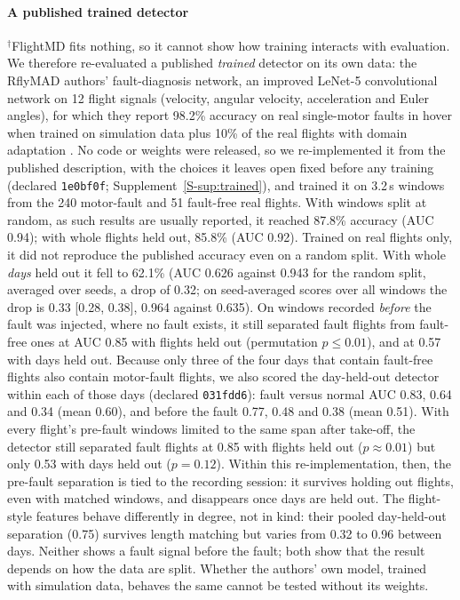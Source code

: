 \documentclass[preprint,12pt]{elsarticle}
\begin{document}
\paragraph{A published trained detector}
\label{sec:trained}
$^\dagger$FlightMD fits nothing, so it cannot show how training interacts with evaluation. We therefore re-evaluated a published \emph{trained} detector on its own data: the RflyMAD authors' fault-diagnosis network, an improved LeNet-5 convolutional network on 12 flight signals (velocity, angular velocity, acceleration and Euler angles), for which they report 98.2\% accuracy on real single-motor faults in hover when trained on simulation data plus 10\% of the real flights with domain adaptation \cite{le2025rflymad}. No code or weights were released, so we re-implemented it from the published description, with the choices it leaves open fixed before any training (declared \texttt{1e0bf0f}; Supplement~\ref{S-sup:trained}), and trained it on 3.2\,s windows from the 240 motor-fault and 51 fault-free real flights. With windows split at random, as such results are usually reported, it reached 87.8\% accuracy (AUC 0.94); with whole flights held out, 85.8\% (AUC 0.92). Trained on real flights only, it did not reproduce the published accuracy even on a random split. With whole \emph{days} held out it fell to 62.1\% (AUC 0.626 against 0.943 for the random split, averaged over seeds, a drop of 0.32; on seed-averaged scores over all windows the drop is 0.33 [0.28, 0.38], 0.964 against 0.635). On windows recorded \emph{before} the fault was injected, where no fault exists, it still separated fault flights from fault-free ones at AUC 0.85 with flights held out (permutation $p\le0.01$), and at 0.57 with days held out. Because only three of the four days that contain fault-free flights also contain motor-fault flights, we also scored the day-held-out detector within each of those days (declared \texttt{031fdd6}): fault versus normal AUC 0.83, 0.64 and 0.34 (mean 0.60), and before the fault 0.77, 0.48 and 0.38 (mean 0.51). With every flight's pre-fault windows limited to the same span after take-off, the detector still separated fault flights at 0.85 with flights held out ($p\approx0.01$) but only 0.53 with days held out ($p=0.12$). Within this re-implementation, then, the pre-fault separation is tied to the recording session: it survives holding out flights, even with matched windows, and disappears once days are held out. The flight-style features behave differently in degree, not in kind: their pooled day-held-out separation (0.75) survives length matching but varies from 0.32 to 0.96 between days. Neither shows a fault signal before the fault; both show that the result depends on how the data are split. Whether the authors' own model, trained with simulation data, behaves the same cannot be tested without its weights.
\end{document}
